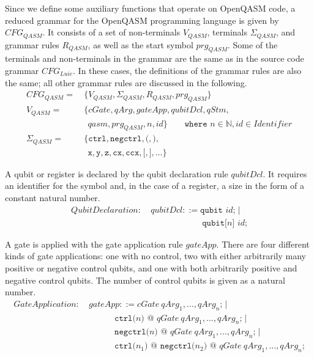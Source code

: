 Since we define some auxiliary functions that operate on OpenQASM code, a reduced grammar for the OpenQASM programming language is given by $CFG_{QASM}$. It consists of a set of non-terminals $V_{QASM}$, terminals $\Sigma_{QASM}$, and grammar rules $R_{QASM}$, as well as the start symbol $prg_{QASM}$. Some of the terminals and non-terminals in the grammar are the same as in the source code grammar $CFG_{Luie}$. In these cases, the definitions of the grammar rules are also the same; all other grammar rules are discussed in the following.
\begin{align*}
    CFG_{QASM} = \ & \{V_{QASM}, \Sigma_{QASM}, R_{QASM}, prg_{QASM} \}\\ 
    V_{QASM} = \ & \{ cGate, qArg, gateApp, qubitDcl, qStm,\\ 
            & \ \  qasm, prg_{QASM}, n, id \}  \quad \quad \texttt{where } n \in \mathbb{N}, id \in Identifier\\ 
    \Sigma_{QASM} = \ & \{\texttt{ctrl}, \texttt{negctrl}, \texttt{(}, \texttt{)}, \\
               & \ \ \texttt{x}, \texttt{y}, \texttt{z}, \texttt{cx}, \texttt{ccx}, \texttt{[}, \texttt{]}, \dots \}
\end{align*}

A qubit or register is declared by the qubit declaration rule $qubitDcl$. It requires an identifier for the symbol and, in the case of a register, a size in the form of a constant natural number. 
\begin{align*}
    QubitDeclaration: \ & qubitDcl::= \texttt{qubit } id \texttt{;} \mid\\
    & \hspace{6em} \texttt{qubit[}n\texttt{] } id \texttt{;}
\end{align*}

A gate is applied with the gate application rule $gateApp$. There are four different kinds of gate applications: one with no control, two with either arbitrarily many positive or negative control qubits, and one with both arbitrarily positive and negative control qubits. The number of control qubits is given as a natural number. 
\begin{align*}
GateApplication: \ & gateApp::= cGate \ qArg_1, ..., qArg_n \texttt{;} \mid\\
& \quad \quad \quad \texttt{ctrl(}n\texttt{)} \texttt{ @ } qGate \ qArg_1, ..., qArg_n \texttt{;} \mid\\
& \quad \quad \quad \texttt{negctrl(}n\texttt{)} \texttt{ @ } qGate \ qArg_1, ..., qArg_n \texttt{;} \mid\\
    & \quad \quad \quad \texttt{ctrl(}n_1\texttt{)} \texttt{ @ } \texttt{negctrl(}n_2\texttt{)} \texttt{ @ } qGate \ qArg_1, ..., qArg_n \texttt{;}
\end{align*}

